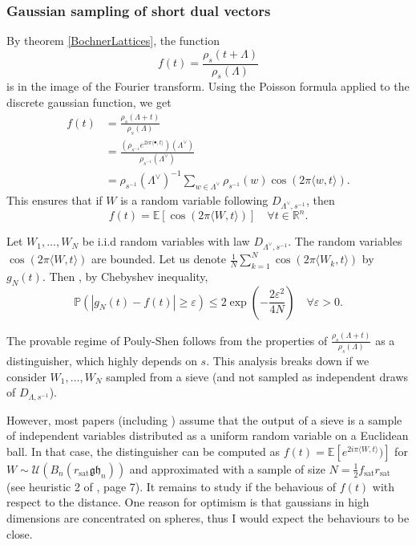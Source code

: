 \documentclass{article}
\begin{document}
\subsubsection{Gaussian sampling of short dual vectors}
By theorem \ref{BochnerLattices}, the function 
\[f(t) = \frac{\rho_s(t+\Lambda)}{\rho_s(\Lambda)}\]
is in the image of the Fourier transform. Using the Poisson formula applied to the discrete gaussian function, we get 
\[\begin{split} 
f(t) & = \frac{ \rho_s (\Lambda + t)}{\rho_s (\Lambda )} \\ 
	& = \frac{ ( \rho_{s^{-1}} e^{2i\pi \langle \bullet , t\rangle }) (\Lambda^\vee) }{ \rho_{s^{-1}}(\Lambda^\vee)} \\
	& = \rho_{s^{-1}}(\Lambda^\vee)^{-1}\sum_{w\in \Lambda^\vee} \rho_{s^{-1}}(w) \cos (2\pi \langle w,t\rangle ) .
\end{split}\]
This ensures that if $W$ is a random variable following $D_{\Lambda^\vee, s^{-1}}$, then 
\[f(t) = \mathbb E[\cos (2\pi \langle W , t \rangle ) ] \quad \forall t\in \mathbb R^n.\] 

Let $W_1,\ldots , W_N$ be i.i.d random variables with law $D_{\Lambda^\vee, s^{-1}}$. The random variables $\cos (2\pi \langle W , t \rangle ) $ are bounded. 
Let us denote $\frac{1}{N}\sum_{k=1}^N \cos (2\pi \langle W_k , t \rangle )$ by $g_N(t)$. Then , by Chebyshev inequality,
\[\mathbb P( |g_N(t) - f(t) |\geq \varepsilon ) \leq  2 \exp( - \frac{2\varepsilon^2}{4N}) \quad \forall \varepsilon >0.\]

The provable regime of Pouly-Shen follows from the properties of $\frac{ \rho_s (\Lambda + t)}{\rho_s (\Lambda )}$ as a distinguisher, which highly depends on $s$. This analysis breaks down if we consider $W_1,\ldots , W_N$ sampled from a sieve (and not sampled as independent draws of $D_{\Lambda,s^{-1}}$). 

However, most papers (including \cite{ducas2023accurate}) assume that the output of a sieve is a sample of independent variables distributed as a uniform random variable on a Euclidean ball. In that case, the distinguisher can be computed as $f(t) = \mathbb E[e^{2i\pi\langle W , t \rangle} )]$ for $W\sim \mathcal U(B_n(r_{\text{sat}} \mathfrak{gh}_n))$ and approximated with a sample of size $N = \frac{1}{2}f_{\text{sat}}r_{\text{sat}} $ (see heuristic 2 of \cite{ducas2023accurate}, page 7). It remains to study if the behavious of $f(t)$ with respect to the distance. One reason for optimism is that gaussians in high dimensions are concentrated on spheres, thus I would expect the behaviours to be close. 
\end{document}
